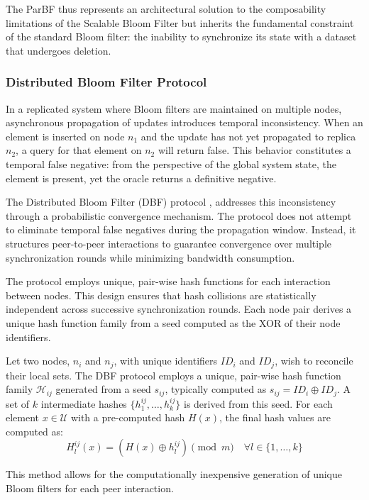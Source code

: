 The ParBF thus represents an architectural solution to the composability limitations of the Scalable Bloom Filter but inherits the fundamental constraint of the standard Bloom filter: the inability to synchronize its state with a dataset that undergoes deletion.

\subsubsection{Distributed Bloom Filter Protocol}

In a replicated system where Bloom filters are maintained on multiple nodes, asynchronous propagation of updates introduces temporal inconsistency. When an element is inserted on node $n_1$ and the update has not yet propagated to replica $n_2$, a query for that element on $n_2$ will return false. This behavior constitutes a temporal false negative: from the perspective of the global system state, the element is present, yet the oracle returns a definitive negative.

The Distributed Bloom Filter (DBF) protocol \cite{Ramabaja2019TheDB}, addresses this inconsistency through a probabilistic convergence mechanism. The protocol does not attempt to eliminate temporal false negatives during the propagation window. Instead, it structures peer-to-peer interactions to guarantee convergence over multiple synchronization rounds while minimizing bandwidth consumption.

The protocol employs unique, pair-wise hash functions for each interaction between nodes. This design ensures that hash collisions are statistically independent across successive synchronization rounds. Each node pair derives a unique hash function family from a seed computed as the XOR of their node identifiers.

\begin{definition}
    Let two nodes, $n_i$ and $n_j$, with unique identifiers $ID_i$ and $ID_j$, wish to reconcile their local sets. The DBF protocol employs a unique, pair-wise hash function family $\mathcal{H}_{ij}$ generated from a seed $s_{ij}$, typically computed as $s_{ij} = ID_i \oplus ID_j$. A set of $k$ intermediate hashes $\{h_1^{ij}, \ldots, h_k^{ij}\}$ is derived from this seed. For each element $x \in \mathcal{U}$ with a pre-computed hash $H(x)$, the final hash values are computed as:
    \begin{equation*}
        H_l^{ij}(x) = (H(x) \oplus h_l^{ij}) \pmod m \quad \forall l \in \{1, \ldots, k\}
    \end{equation*}
\end{definition}
This method allows for the computationally inexpensive generation of unique Bloom filters for each peer interaction.

